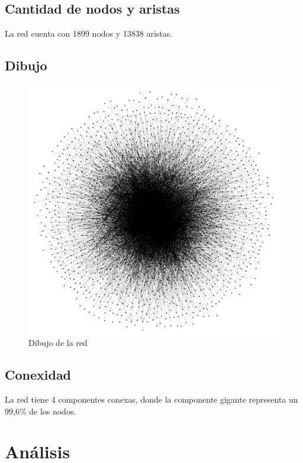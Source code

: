 \documentclass[12pt]{article}
\begin{document}
\subsection{Cantidad de nodos y aristas}
La red cuenta con 1899 nodos y 13838 aristas.

\subsection{Dibujo}
\begin{figure}[H]
    \begin{center}
        \includegraphics[scale=0.4]{images/dibujo_red.png}
    \end{center}
    \caption{Dibujo de la red}
    \label{fig:drawing}
\end{figure}

\subsection{Conexidad}
La red tiene 4 componentes conexas, donde la componente gigante representa un 99,6\% de los nodos.

\section{Análisis}
\end{document}
